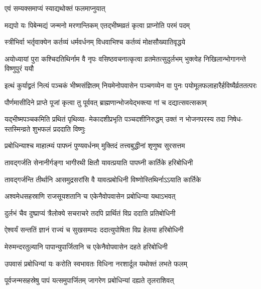 \onelineshloka
{एवं सम्यक्समाप्यं स्याद्यथोक्तं फलमाप्नुयात्} %

\twolineshloka
{मद्यपो यः पिबेन्मद्यं जन्मनो मरणान्तिकम्}
{एतद्भीष्मव्रतं कृत्वा प्राप्नोति परमं पदम्} %

\twolineshloka
{स्त्रीभिर्वा भर्तृवाक्येन कर्तव्यं धर्मवर्धनम्}
{विधवाभिश्च कर्तव्यं मोक्षसौख्यातिवृद्धये} %

\threelineshloka
{अयोध्यायां पुरा कश्चिदतिथिर्नाम वै नृपः}
{वसिष्ठवचनात्कृत्वा व्रतमेतत्सुदुर्लभम्}
{भुक्त्वेह निखिलान्भोगानन्ते विष्णुपुरं ययौ} %

\threelineshloka
{इत्थं कुर्याद्व्रतं नित्यं पञ्चकं भीष्मसंज्ञितम्}
{नियमेनोपवासेन पञ्चगव्येन वा पुनः}
{पयोमूलफलाहारैर्हविष्यैर्व्रततत्परः} %

\twolineshloka
{पौर्णमासीदिने प्राप्ते पूजां कृत्वा तु पूर्ववत्}
{ब्राह्मणान्भोजयेद्भक्त्या गां च दद्यात्सवत्सकाम्} %

\fourlineindentedshloka
{यद्भीष्मपञ्चकमिति प्रथितं पृथिव्या-}
{मेकादशीप्रभृति पञ्चदशीनिरुद्धम्}
{उक्तं न भोजनपरस्य तदा निषेध-}
{स्तस्मिन्व्रते शुभफलं प्रददाति विष्णुः} %





\twolineshloka
{प्रबोधिन्याश्च माहात्म्यं पापघ्नं पुण्यवर्धनम्}
{मुक्तिदं तत्त्वबुद्धीनां शृणुष्व सुरसत्तम} %

\twolineshloka
{तावद्गर्जति सेनानीर्गङ्गा भागीरथी क्षितौ}
{यावत्प्रयाति पापघ्नी कार्तिके हरिबोधिनी} %

\twolineshloka
{तावद्गर्जन्ति तीर्थानि आसमुद्रसरांसि वै}
{यावत्प्रबोधिनी विष्णोस्तिथिर्नाऽऽयाति कार्तिके} %

\twolineshloka
{अश्वमेधसहस्राणि राजसूयशतानि च}
{एकेनैवोपवासेन प्रबोधिन्या यथाऽभवत्} %

\twolineshloka
{दुर्लभं चैव दुष्प्राप्यं त्रैलोक्ये सचराचरे}
{तदपि प्रार्थितं विप्र ददाति प्रतिबोधिनी} %

\twolineshloka
{ऐश्वर्यं सन्ततिं ज्ञानं राज्यं च सुखसम्पदः}
{ददात्युपोषिता विप्र हेलया हरिबोधिनी} %

\twolineshloka
{मेरुमन्दरतुल्यानि पापान्युपार्जितानि च}
{एकेनैवोपवासेन दहते हरिबोधिनी} %

\twolineshloka
{उपवासं प्रबोधिन्यां यः करोति स्वभावतः}
{विधिना नरशार्दूल यथोक्तं लभते फलम्} %

\twolineshloka
{पूर्वजन्मसहस्रेषु पापं यत्समुपार्जितम्}
{जागरेण प्रबोधिन्यां दह्यते तृलराशिवत्} %

